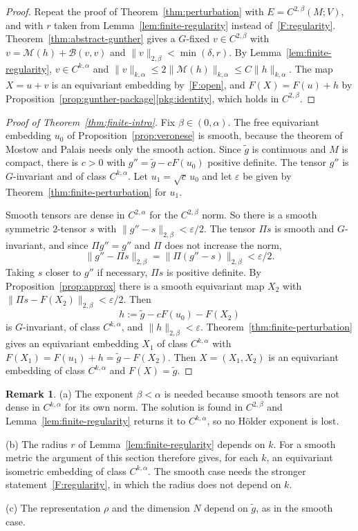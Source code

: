 \documentclass[11pt]{amsart}
\theoremstyle{definition}
\newtheorem{remark}[theorem]{Remark}
\newcommand{\cM}{\mathcal{M}}
\newcommand{\cB}{\mathcal{B}}
\begin{document}
\begin{proof}
Repeat the proof of Theorem~\ref{thm:perturbation} with $E=C^{2,\beta}(M;V)$, and with $r$ taken
from Lemma~\ref{lem:finite-regularity} instead of~\ref{F:regularity}.
Theorem~\ref{thm:abstract-gunther} gives a $G$-fixed $v\in C^{2,\beta}$ with $v=\cM(h)+\cB(v,v)$
and $\|v\|_{2,\beta}<\min(\delta,r)$. By Lemma~\ref{lem:finite-regularity}, $v\in C^{k,\alpha}$
and $\|v\|_{k,\alpha}\le2\|\cM(h)\|_{k,\alpha}\le C\|h\|_{k,\alpha}$. The map $X=u+v$ is an
equivariant embedding by~\ref{F:open}, and $F(X)=F(u)+h$ by
Proposition~\ref{prop:gunther-package}\ref{pkg:identity}, which holds in $C^{2,\beta}$.
\end{proof}

\begin{proof}[Proof of Theorem~\ref{thm:finite-intro}]
Fix $\beta\in(0,\alpha)$. The free equivariant embedding $u_0$ of
Proposition~\ref{prop:veronese} is smooth, because the theorem of Mostow and Palais needs only
the smooth action. Since $\tilde g$ is continuous and $M$ is compact, there is $c>0$ with
$g''=\tilde g-cF(u_0)$ positive definite. The tensor $g''$ is $G$-invariant and of class
$C^{k,\alpha}$. Let $u_1=\sqrt c\,u_0$ and let $\varepsilon$ be given by
Theorem~\ref{thm:finite-perturbation} for $u_1$.

Smooth tensors are dense in $C^{2,\alpha}$ for the $C^{2,\beta}$ norm. So there is a smooth
symmetric $2$-tensor $s$ with $\|g''-s\|_{2,\beta}<\varepsilon/2$. The tensor $\Pi s$ is smooth
and $G$-invariant, and since $\Pi g''=g''$ and $\Pi$ does not increase the norm,
\[
\|g''-\Pi s\|_{2,\beta}=\|\Pi(g''-s)\|_{2,\beta}<\varepsilon/2 .
\]
Taking $s$ closer to $g''$ if necessary, $\Pi s$ is positive definite. By
Proposition~\ref{prop:approx} there is a smooth equivariant map $X_2$ with
$\|\Pi s-F(X_2)\|_{2,\beta}<\varepsilon/2$. Then
\[
h:=\tilde g-cF(u_0)-F(X_2)
\]
is $G$-invariant, of class $C^{k,\alpha}$, and $\|h\|_{2,\beta}<\varepsilon$.
Theorem~\ref{thm:finite-perturbation} gives an equivariant embedding $X_1$ of class $C^{k,\alpha}$
with $F(X_1)=F(u_1)+h=\tilde g-F(X_2)$. Then $X=(X_1,X_2)$ is an equivariant embedding of class
$C^{k,\alpha}$ and $F(X)=\tilde g$.
\end{proof}

\begin{remark}\label{rem:finite}
(a) The exponent $\beta<\alpha$ is needed because smooth tensors are not dense in $C^{k,\alpha}$
for its own norm. The solution is found in $C^{2,\beta}$ and Lemma~\ref{lem:finite-regularity}
returns it to $C^{k,\alpha}$, so no H\"older exponent is lost.

(b) The radius $r$ of Lemma~\ref{lem:finite-regularity} depends on $k$. For a smooth metric the
argument of this section therefore gives, for each $k$, an equivariant isometric embedding of
class $C^{k,\alpha}$. The smooth case needs the stronger statement~\ref{F:regularity}, in which
the radius does not depend on $k$.

(c) The representation $\rho$ and the dimension $N$ depend on $\tilde g$, as in the smooth case.
\end{remark}
\end{document}
